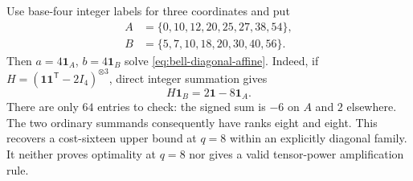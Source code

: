 \begin{example}
\label{ex:bell-diagonal-eight}
Use base-four integer labels for three coordinates and put
\[
 \begin{split}
 A&=\{0,10,12,20,25,27,38,54\},\\
 B&=\{5,7,10,18,20,30,40,56\}.
 \end{split}
\]
Then $a=4\mathbf1_A$, $b=4\mathbf1_B$ solve
\eqref{eq:bell-diagonal-affine}. Indeed, if
$H=(\mathbf1\mathbf1^{\mathsf T}-2I_4)^{\otimes3}$, direct
integer summation gives
\[
 H\mathbf1_B=2\mathbf1-8\mathbf1_A.
\]
There are only $64$ entries to check: the signed sum is $-6$
on $A$ and $2$ elsewhere. The two ordinary summands consequently
have ranks eight and eight. This recovers a cost-sixteen upper
bound at $q=8$ within an explicitly diagonal family.
It neither proves optimality at $q=8$ nor gives a valid
tensor-power amplification rule.
\end{example}

